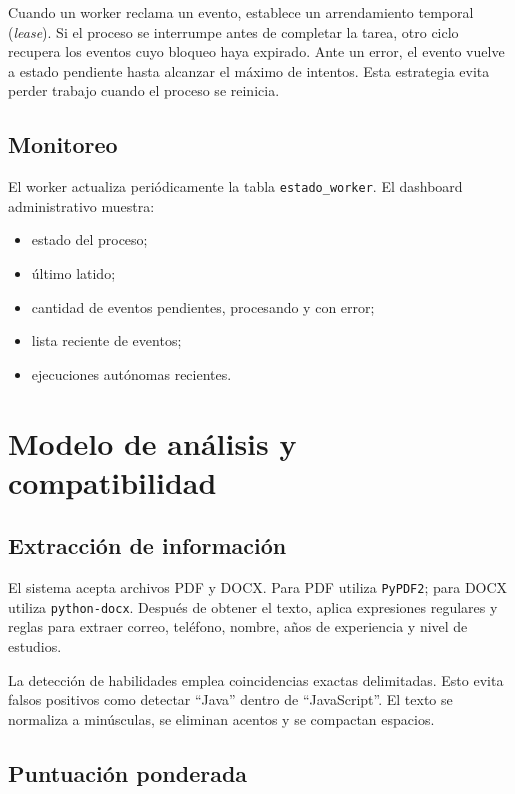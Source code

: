 \documentclass[12pt,a4paper]{article}
\begin{document}
Cuando un worker reclama un evento, establece un arrendamiento temporal (\emph{lease}). Si el proceso se interrumpe antes de completar la tarea, otro ciclo recupera los eventos cuyo bloqueo haya expirado. Ante un error, el evento vuelve a estado pendiente hasta alcanzar el máximo de intentos. Esta estrategia evita perder trabajo cuando el proceso se reinicia.

\subsection{Monitoreo}

El worker actualiza periódicamente la tabla \texttt{estado\_worker}. El dashboard administrativo muestra:

\begin{itemize}[leftmargin=*]
    \item estado del proceso;
    \item último latido;
    \item cantidad de eventos pendientes, procesando y con error;
    \item lista reciente de eventos;
    \item ejecuciones autónomas recientes.
\end{itemize}

\section{Modelo de análisis y compatibilidad}

\subsection{Extracción de información}

El sistema acepta archivos PDF y DOCX. Para PDF utiliza \texttt{PyPDF2}; para DOCX utiliza \texttt{python-docx}. Después de obtener el texto, aplica expresiones regulares y reglas para extraer correo, teléfono, nombre, años de experiencia y nivel de estudios.

La detección de habilidades emplea coincidencias exactas delimitadas. Esto evita falsos positivos como detectar ``Java'' dentro de ``JavaScript''. El texto se normaliza a minúsculas, se eliminan acentos y se compactan espacios.

\subsection{Puntuación ponderada}
\end{document}
